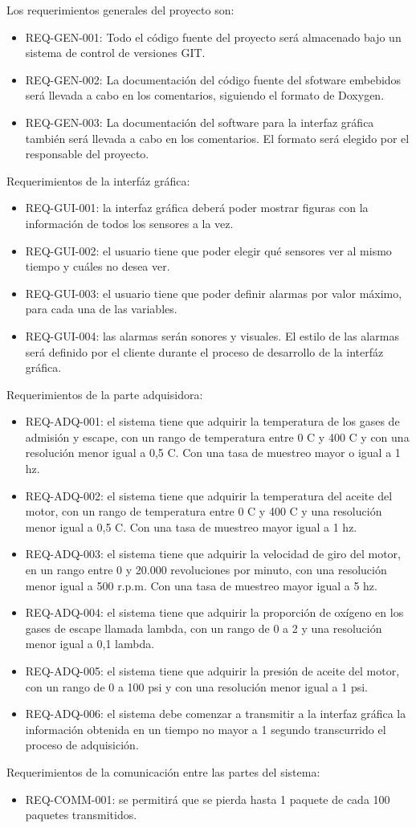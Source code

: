 Los requerimientos generales del proyecto son:
\begin{itemize}
\item REQ-GEN-001: Todo el código fuente del proyecto será almacenado bajo un sistema de control de versiones GIT.
\item REQ-GEN-002: La documentación del código fuente del sfotware embebidos será llevada a cabo en los comentarios, siguiendo el formato de Doxygen.
\item REQ-GEN-003: La documentación del software para la interfaz gráfica también será llevada a cabo en los comentarios. El formato será elegido por el responsable del proyecto.
\end{itemize}

Requerimientos de la interfáz gráfica:
\begin{itemize}
\item REQ-GUI-001: la interfaz gráfica deberá poder mostrar figuras con la información de todos los sensores a la vez.
\item REQ-GUI-002: el usuario tiene que poder elegir qué sensores ver al mismo tiempo y cuáles no desea ver.
\item REQ-GUI-003: el usuario tiene que poder definir alarmas por valor máximo, para cada una de las variables.
\item REQ-GUI-004: las alarmas serán sonores y visuales. El estilo de las alarmas será definido por el cliente durante el proceso de desarrollo de la interfáz gráfica.
\end{itemize}

Requerimientos de la parte adquisidora:
\begin{itemize}
\item REQ-ADQ-001: el sistema tiene que adquirir la temperatura de los gases de admisión y escape, con un rango de temperatura entre 0 \degree C y 400 \degree C y con una resolución menor igual a 0,5 \degree C. Con una tasa de muestreo mayor o igual a 1 hz.
\item REQ-ADQ-002: el sistema tiene que adquirir la temperatura del aceite del motor, con un rango de temperatura entre 0 \degree C y 400 \degree C y una resolución menor igual a 0,5 \degree C. Con una tasa de muestreo mayor igual a 1 hz.
\item REQ-ADQ-003: el sistema tiene que adquirir la velocidad de giro del motor, en un rango entre 0 y 20.000 revoluciones por minuto, con una resolución menor igual a 500 r.p.m. Con una tasa de muestreo mayor igual a 5 hz.
\item REQ-ADQ-004: el sistema tiene que adquirir la proporción de oxígeno en los gases de escape llamada lambda, con un rango de 0 a 2 y una resolución menor igual a 0,1 lambda.
\item REQ-ADQ-005: el sistema tiene que adquirir la presión de aceite del motor, con un rango de 0 a 100 psi y con una resolución menor igual a 1 psi.
\item REQ-ADQ-006: el sistema debe comenzar a transmitir a la interfaz gráfica la información obtenida en un tiempo no mayor a 1 segundo transcurrido el proceso de adquisición.
\end{itemize}

Requerimientos de la comunicación entre las partes del sistema:
\begin{itemize}
\item REQ-COMM-001: se permitirá que se pierda hasta 1 paquete de cada 100 paquetes transmitidos.
\end{itemize}